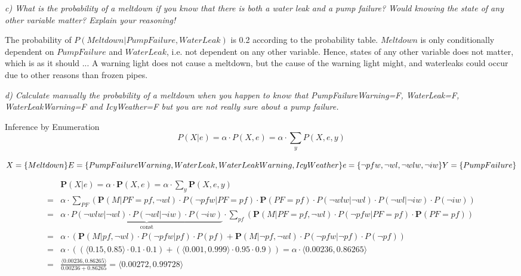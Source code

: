 \begin{framed}\em c) What is the probability of a meltdown if you know that there is both a water leak and a pump failure? Would knowing the state of any other variable matter? Explain your reasoning!\em\end{framed}

The probability of $P(Meltdown|PumpFailure, WaterLeak)$ is 0.2 according to the probability table. $Meltdown$ is only conditionally dependent on $PumpFailure$ and $WaterLeak$, i.e. not dependent on any other variable. Hence, states of any other variable does not matter, which is as it should ... A warning light does not cause a meltdown, but the cause of the warning light might, and waterleaks could occur due to other reasons than frozen pipes.

\begin{framed}\em d) Calculate manually the probability of a meltdown when you happen to know that PumpFailureWarning=F, WaterLeak=F, WaterLeakWarning=F and IcyWeather=F but you are not really sure about a pump failure. \em\end{framed}
\newpage

Inference by Enumeration
$$P(X|e) = \alpha\cdot P(X,e) = \alpha\cdot\sum_{y}P(X,e,y)$$

$X = \{Meltdown\}\\E=\{PumpFailureWarning, WaterLeak, WaterLeakWarning, IcyWeather\}\\e=\{\neg pfw, \neg wl, \neg wlw,\neg iw\}\\Y=\{PumpFailure\}$

\begin{align*}
  & \textbf{P}(X|e) = \alpha\cdot \textbf{P}(X,e) = \alpha\cdot\sum_{y}\textbf{P}(X,e,y)\\
  = & \alpha\cdot\sum_{PF}(\textbf{P}(M|PF=pf,\neg wl)\cdot
  P(\neg pfw | PF = pf)\cdot
  \textbf{P}(PF=pf)\cdot
  P(\neg wlw | \neg wl)\cdot
  P(\neg wl | \neg iw)\cdot
  P(\neg iw))\\
  = & \alpha\cdot \underbrace{P(\neg wlw | \neg wl)\cdot P(\neg wl | \neg iw)\cdot P(\neg iw)}_{\mathrm{const}}\cdot
  \sum_{pf}(\textbf{P}(M|PF = pf,\neg wl)\cdot
  P(\neg pfw|PF=pf)\cdot \textbf{P}(PF=pf))\\
  = & \alpha\cdot(\textbf{P}(M|pf,\neg wl)\cdot P(\neg pfw|pf)\cdot P(pf)
  + \textbf{P}(M|\neg pf, \neg wl)\cdot P(\neg pfw| \neg pf)\cdot P(\neg pf))\\
  = & \alpha\cdot((\langle 0.15,0.85\rangle \cdot 0.1\cdot 0.1)+(\langle 0.001, 0.999\rangle \cdot 0.95 \cdot 0.9))
  = \alpha\cdot\langle 0.00236,0.86265 \rangle\\
  = & \frac{\langle 0.00236,0.86265 \rangle}{0.00236+0.86265} = \langle 0.00272,0.99728  \rangle
\end{align*}

